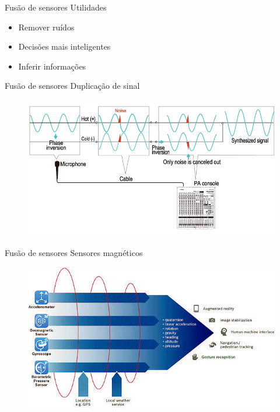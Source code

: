 \documentclass[t]{beamer}
\begin{document}
\begin{frame}{Fusão de sensores}
Utilidades
\begin{itemize}
	\item Remover ruídos
	\item Decisões mais inteligentes
	\item Inferir informações
\end{itemize}
\end{frame}

\begin{frame}{Fusão de sensores}
Duplicação de sinal
\begin{figure}
	\includegraphics[width=\linewidth]{pa_beginners_cable_ph09}
\end{figure}
\end{frame}

\begin{frame}{Fusão de sensores}
Sensores magnéticos
\begin{figure}
	\includegraphics[width=\linewidth]{sensorfusion}
\end{figure}
\end{frame}
\end{document}
